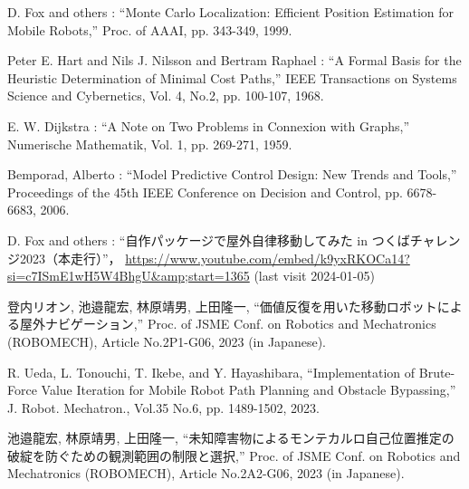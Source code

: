 \documentclass[twocolumn,9pt]{jsproceedings}
\begin{document}
\begin{thebibliography}{99}
  D. Fox and others : ``Monte Carlo Localization: Efficient Position Estimation for Mobile Robots,''
  Proc. of AAAI, pp. 343-349, 1999.

  Peter E. Hart and Nils J. Nilsson and Bertram Raphael : ``A Formal Basis for the Heuristic Determination of Minimal Cost Paths,''
  IEEE Transactions on Systems Science and Cybernetics, Vol. 4, No.2, pp. 100-107, 1968.

  E. W. Dijkstra : ``A Note on Two Problems in Connexion with Graphs,''
  Numerische Mathematik, Vol. 1, pp. 269-271, 1959.

  Bemporad, Alberto : ``Model Predictive Control Design: New Trends and Tools,''
  Proceedings of the 45th IEEE Conference on Decision and Control, pp. 6678-6683, 2006.

  D. Fox and others : ``自作パッケージで屋外自律移動してみた in つくばチャレンジ2023（本走行）''，
  \url{https://www.youtube.com/embed/k9yxRKOCa14?si=c7ISmE1wH5W4BhgU&amp;start=1365} (last visit 2024-01-05)

  登内リオン, 池邉龍宏, 林原靖男, 上田隆一, “価値反復を用いた移動ロボットによる屋外ナビゲーション,” 
  Proc. of JSME Conf. on Robotics and Mechatronics (ROBOMECH), Article No.2P1-G06, 2023 (in Japanese). 

  R. Ueda, L. Tonouchi, T. Ikebe, and Y. Hayashibara, “Implementation of Brute-Force Value Iteration for Mobile Robot Path Planning and Obstacle Bypassing,” 
  J. Robot. Mechatron., Vol.35 No.6, pp. 1489-1502, 2023.

  池邉龍宏, 林原靖男, 上田隆一, “未知障害物によるモンテカルロ自己位置推定の破綻を防ぐための観測範囲の制限と選択,” 
  Proc. of JSME Conf. on Robotics and Mechatronics (ROBOMECH), Article No.2A2-G06, 2023 (in Japanese). 
\end{thebibliography}
\normalsize

\clearpage

\end{document}
